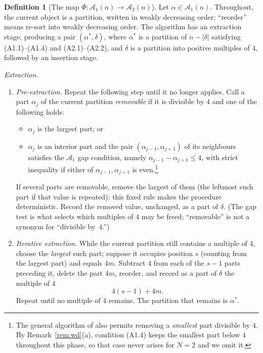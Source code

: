 \documentclass[11pt]{amsart}
\theoremstyle{definition}
\newtheorem{definition}[theorem]{Definition}
\theoremstyle{remark}
\newcommand{\Aone}{\mathcal A_1}
\newcommand{\Atwo}{\mathcal A_2}
\begin{document}
\begin{definition}[The map \(\Phi:\Aone(n)\to\Atwo(n)\)]\label{def:Phi}
Let \(\alpha\in\Aone(n)\). Throughout, the current object is a partition, written
in weakly decreasing order; ``reorder'' means re-sort into weakly decreasing
order. The algorithm has an extraction stage, producing a pair
\((\alpha^\ast,\delta)\), where \(\alpha^\ast\) is a partition of \(n-|\delta|\) satisfying \textup{(A1.1)}--\textup{(A1.4)} and \textup{(A2.1)}--\textup{(A2.2)}, and \(\delta\)
is a partition into positive multiples of \(4\), followed by an insertion stage.

\smallskip
\noindent\emph{Extraction.}
\begin{enumerate}[label=\textup{(\roman*)}]
\item \emph{Pre-extraction.} Repeat the following step until it no longer applies.
   Call a part \(\alpha_j\) of the current partition \emph{removable} if it is divisible by \(4\) and one of the following holds:
   \begin{itemize}
   \item \(\alpha_j\) is the largest part; or
   \item \(\alpha_j\) is an interior part and the pair
         \((\alpha_{j-1},\alpha_{j+1})\) of its neighbours satisfies the
         \(\Aone\) gap condition, namely \(\alpha_{j-1}-\alpha_{j+1}\le 4\), with strict
         inequality if either of \(\alpha_{j-1},\alpha_{j+1}\) is even.\footnote{The general algorithm of \cite[Section 3]{CGJL} also permits removing a \emph{smallest} part divisible by $4$. By Remark~\ref{rem:wd}(a), condition \textup{(A1.4)} keeps the smallest part below $4$ throughout this phase, so that case never arises for $N=2$ and we omit it.}
   \end{itemize}
   If several parts are removable, remove the largest of them (the leftmost such part if that value is repeated); this fixed rule makes the procedure deterministic. Record the removed value, unchanged, as a part of
   \(\delta\). (The gap test is what selects which multiples of \(4\) may be freed;
   ``removable'' is not a synonym for ``divisible by~\(4\).'')
\item \emph{Iterative extraction.} While the current partition still contains a
   multiple of \(4\), choose the \emph{largest} such part; suppose it occupies
   position \(s\) (counting from the largest part) and equals \(4m\). Subtract \(4\)
   from each of the \(s-1\) parts preceding it, delete the part \(4m\), reorder, and
   record as a part of \(\delta\) the multiple of \(4\)
   \[
      4(s-1)+4m .
   \]
   Repeat until no multiple of \(4\) remains. The partition that remains is
   \(\alpha^\ast\).
\end{enumerate}


\end{definition}
\end{document}

